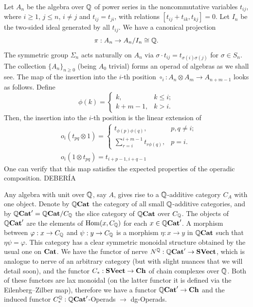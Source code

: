 \documentclass[TFM.tex]{subfiles}
\begin{document}
Let $A_n$ be the algebra over $\mathbb{Q}$ of power series in the noncommutative variables $t_{ij}$, where $i\geq 1$, $j\leq n$, $i\neq j$ and $t_{ij}=t_{ji}$, with relations $[t_{ij}+t_{ik},t_{kj}]=0$. Let $I_n$ be the two-sided ideal generated by all $t_{ij}$. We have a canonical projection 
\begin{equation}\label{canonical}
\pi:A_n\to A_n/I_n\cong\mathbb{Q}.
\end{equation}
The symmetric group $\Sigma_n$ acts naturally on $A_n$ via $\sigma\cdot t_{ij}=t_{\sigma(i)\sigma(j)}$ for $\sigma\in S_n$. The collection $\{A_n\}_{n\geq 0}$ (being $A_0$ trivial) forms an operad of algebras as we shall see. The map of the insertion into the $i$-th position $\circ_i: A_n\otimes A_m\to A_{n+m-1}$ looks as follows. Define
\[
\phi(k)=\begin{cases}
k, & k\leq i;\\
k+m-1, & k>i.
\end{cases}
\]
Then, the insertion into the $i$-th position is the linear extension of
\begin{align*}
&o_i(t_{pq}\otimes 1)=\begin{cases}
t_{\phi(p)\phi(q)}, &p,q\neq i;\\
\sum_{r=i}^{i+m-1}t_{r\phi(q)}, & p=i.
\end{cases} \\
& o_i(1\otimes t_{pq})=t_{i+p-1,i+q-1}
\end{align*}
One can verify that this map satisfies the expected properties of the operadic composition. DEBERÍA 

Any algebra with unit over $\mathbb{Q}$, say $A$, gives rise to a $\mathbb{Q}$-additive category $C_A$ with one object. Denote by $\mathbb{Q}\mathrm{\mathbf{Cat}}$ the category of all small $\mathbb{Q}$-additive categories, and by $\mathbb{Q}\mathrm{\mathbf{Cat}}'=\mathbb{Q}\mathrm{\mathbf{Cat}}/C_{\mathbb{Q}}$ the slice category of $\mathbb{Q}\mathrm{\mathbf{Cat}}$ over $C_{\mathbb{Q}}$. The objects of $\mathbb{Q}\mathrm{\mathbf{Cat}}'$ are the elements of $\operatorname{Hom}(x, C_{\mathbb{Q}})$ for each $x\in \mathbb{Q}\mathrm{\mathbf{Cat}}'$. A morphism between $\varphi:x\to C_{\mathbb{Q}}$ and $\psi:y\to C_{\mathbb{Q}}$ is a morphism $\eta: x\to y$ in $\mathbb{Q}\mathrm{\mathbf{Cat}}$ such that $\eta\psi=\varphi$.  This category has a clear symmetric monoidal structure obtained by the usual one on $\mathrm{\mathbf{Cat}}$. We have the functor of nerve
$N^{\mathbb{Q}}: \mathbb{Q}\mathrm{\mathbf{Cat}}'\to \mathrm{\mathbf{SVect}}$, which is analogue to nerve of an arbitrary
category (but with slight nuances that we will detail soon), and the functor $C_*: \mathrm{\mathbf{SVect}} \to\mathrm{\mathbf{Ch}}$ of chain complexes over $\mathbb{Q}$. Both of these functors are lax monoidal (on the latter functor it is defined via the Eilenberg–Zilber map), therefore we have a functor $\mathbb{Q}\mathrm{\mathbf{Cat}}'\to\mathrm{\mathbf{Ch}}$ and the induced functor $C_*^{\mathbb{Q}}:\mathbb{Q}\mathrm{\mathbf{Cat}}'$-Operads $\to$ dg-Operads. 
\end{document}
